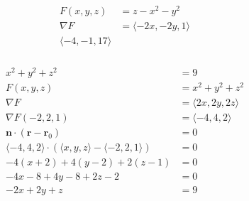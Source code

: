 \documentclass{article}
\begin{document}
\setcounter{subsubsection}{12}
\subsubsection{}

\begin{align*}
  F(x, y, z) & = z - x^2 - y^2                 \\
  \nabla F   & = \langle -2 x, -2 y, 1 \rangle \\
  \langle -4, -1, 17 \rangle
\end{align*}

\setcounter{subsubsection}{14}
\subsubsection{}

\begin{align*}
  x^2 + y^2 + z^2                                                                     & = 9                             \\
  F(x, y, z)                                                                          & = x^2 + y^2 + z^2               \\
  \nabla F                                                                            & = \langle 2 x, 2 y, 2 z \rangle \\
  \nabla F(-2, 2, 1)                                                                  & = \langle -4, 4, 2 \rangle      \\
  \mathbf{n} \cdot (\mathbf{r} - \mathbf{r}_0)                                        & = 0                             \\
  \langle -4, 4, 2 \rangle \cdot (\langle x, y, z \rangle - \langle -2, 2, 1 \rangle) & = 0                             \\
  -4 (x + 2) + 4 (y - 2) + 2 (z - 1)                                                  & = 0                             \\
  -4 x - 8 + 4 y - 8 + 2 z - 2                                                        & = 0                             \\
  -2 x + 2 y + z                                                                      & = 9
\end{align*}

\setcounter{subsubsection}{16}
\subsubsection{}
\end{document}
